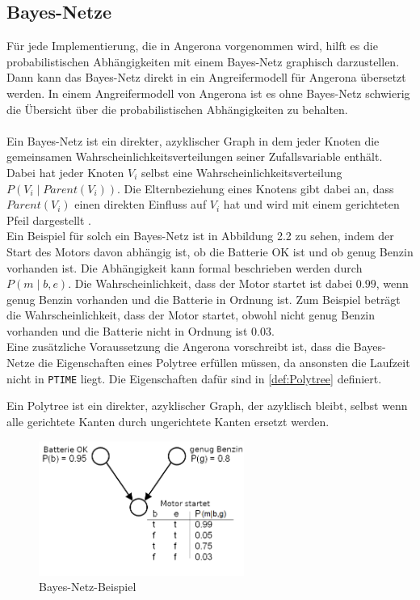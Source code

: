 \documentclass[german,version-2020-11]{uzl-thesis}
\begin{document}
\subsection{Bayes-Netze} \label{sub:bayes}
Für jede Implementierung, die in Angerona vorgenommen wird, hilft es die probabilistischen Abhängigkeiten mit einem Bayes-Netz graphisch darzustellen. Dann kann das Bayes-Netz direkt in ein Angreifermodell für Angerona übersetzt werden. In einem Angreifermodell von Angerona ist es ohne Bayes-Netz schwierig die Übersicht über die probabilistischen Abhängigkeiten zu behalten.\\ \\
Ein Bayes-Netz ist ein direkter, azyklischer Graph in dem jeder Knoten die gemeinsamen Wahrscheinlichkeitsverteilungen seiner Zufallsvariable enthält. Dabei hat jeder Knoten $V_i$ selbst eine Wahrscheinlichkeitsverteilung $P(V_i \mid Parent(V_i) )$. Die Elternbeziehung eines Knotens gibt dabei an, dass $Parent(V_i) $ einen direkten Einfluss auf $V_i$ hat und wird  mit einem gerichteten Pfeil dargestellt \cite{3}.\\  Ein Beispiel für solch ein Bayes-Netz ist in Abbildung 2.2 zu sehen, indem der Start des Motors davon abhängig ist, ob die Batterie OK ist und ob genug Benzin vorhanden ist. Die Abhängigkeit kann formal beschrieben werden durch $P(m \mid b,e)$. Die Wahrscheinlichkeit, dass der Motor startet ist dabei $0.99$, wenn genug Benzin vorhanden und die Batterie in Ordnung ist. Zum Beispiel beträgt die Wahrscheinlichkeit, dass der Motor startet, obwohl nicht genug Benzin vorhanden und die Batterie nicht in Ordnung ist $0.03$. \\
Eine zusätzliche Voraussetzung die Angerona vorschreibt ist, dass die Bayes-Netze die Eigenschaften eines Polytree erfüllen müssen, da ansonsten die Laufzeit nicht in \texttt{PTIME} liegt\cite{guarnieri2017securing}. Die Eigenschaften dafür sind in \cref{def:Polytree} definiert.
 \begin{definition}[Polytree]\label{def:Polytree}
	Ein Polytree ist ein direkter, azyklischer Graph, der azyklisch bleibt, selbst wenn alle gerichtete Kanten durch ungerichtete Kanten ersetzt werden.
\end{definition}
\begin{figure}[ht]
	\centering
	\includegraphics[width=0.6\textwidth]{bayes-netz-bsp.PNG}
	\caption{Bayes-Netz-Beispiel \cite{10}}
	\label{fig}
\end{figure}
\end{document}
